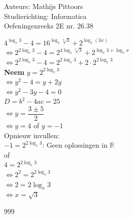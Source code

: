 \documentclass[a4paper]{article}
\begin{document}
  
\noindent \large Auteurs: Mathijs Pittoors\\
\noindent \large Studierichting: Informatica\\
\noindent \large Oefeningenreeks 2E nr. 26.38\\

\medskip

\normalsize

$4^{\log_x 3} - 4 = 16^{\log_x \sqrt[4]{3}} + 2^{\log_x(3x)}$\\

$\Leftrightarrow 2^{2\log_x 3} - 4 = 2^{4\log_x \sqrt[4]{3}} + 2^{\log_x 3 + \log_x x}$\\

$\Leftrightarrow 2^{2\log_x 3} - 4 = 2^{2\log_x 3} + 2 \cdot 2^{2\log_x 3}$\\

\textbf{Neem} $y = 2^{2\log_x 3}$\\

$\Leftrightarrow y^2 - 4 = y + 2y$\\

$\Leftrightarrow y^2 -3y - 4 = 0$\\

$D = b^2 - 4ac = 25$\\

$\Leftrightarrow y = \dfrac{3\pm 5}{2}$\\

$\Leftrightarrow y = 4$ of $y = -1$\\

Opnieuw invullen:\\

$-1 = 2^{2\log_x 3}$: Geen oplossingen in $\mathbb{R}$\\

of\\

$4 = 2^{2\log_x 3}$\\

$\Leftrightarrow 2^2 = 2^{2\log_x 3}$\\

$\Leftrightarrow 2 = 2\log_x 3$\\

$\Leftrightarrow x = \sqrt{3}$


\begin{thebibliography}{999}
\end{thebibliography}
\end{document}
